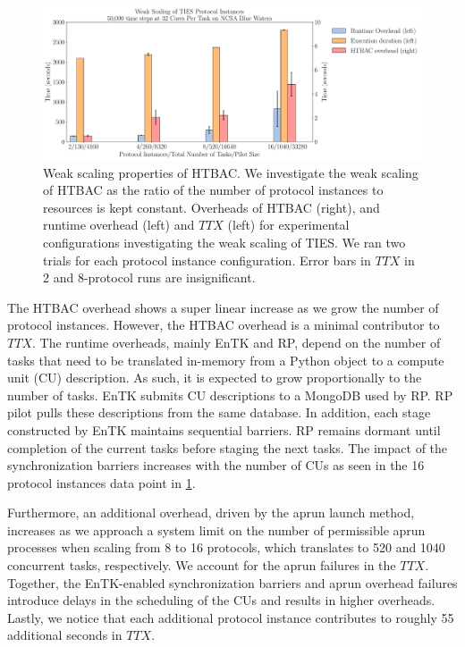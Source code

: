 \begin{figure}
  \centering
   \includegraphics[width=\columnwidth]
   {figures/weak_scaling_TIES_instances_50,000_timesteps_with_16_instances.pdf}
  \caption{Weak scaling properties of HTBAC. We investigate the
  weak scaling of HTBAC as the ratio of the number of protocol instances to
  resources is kept constant. Overheads of HTBAC (right), and runtime overhead 
  (left) and \(TTX\) (left) for experimental configurations investigating the 
  weak scaling of TIES. We ran two trials for each protocol instance 
  configuration. Error bars in \(TTX\) in 2 and 8-protocol runs are 
  insignificant.}
\label{fig:weak_scaling}
\end{figure}

The HTBAC overhead shows a super linear increase as we grow the number of protocol
instances. However, the HTBAC overhead is a minimal contributor to \(TTX\).
The runtime overheads, mainly EnTK and RP, depend on the number of tasks that need to
be translated in-memory from a Python object to a compute unit (CU) description.
As such, it is expected to grow proportionally to the number of tasks. EnTK
submits CU descriptions to a MongoDB used by RP. RP pilot pulls these
descriptions from the same database. 
In addition, each stage constructed by EnTK maintains sequential barriers. 
RP remains dormant until completion of the current tasks before staging
the next tasks. The impact of the synchronization barriers increases with the
number of CUs as seen in the 16 protocol instances data point in
\ref{fig:weak_scaling}.

Furthermore, an additional overhead, driven by the aprun launch method,
increases as we approach a system limit on the number of permissible aprun
processes when scaling from 8 to 16 protocols, which translates to 520 and
1040 concurrent tasks, respectively. We account for the aprun failures in the
\(TTX\). Together, the EnTK-enabled synchronization barriers and aprun
overhead failures introduce delays in the scheduling of the CUs and results in
higher overheads. Lastly, we notice that each additional protocol instance
contributes to roughly 55 additional seconds in \(TTX\). 


